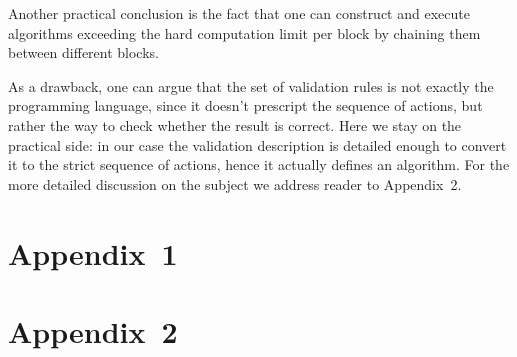 \documentclass[runningheads]{llncs}
\begin{document}
    Another practical conclusion is the fact that one can construct and execute
    algorithms exceeding the hard computation limit per block by chaining them
    between different blocks.

    As a drawback, one can argue that the set of validation rules is not exactly
    the programming language, since it doesn't prescript the sequence of actions,
    but rather the way to check whether the result is correct. Here we stay on the
    practical side: in our case the validation description is detailed enough to
    convert it to the strict sequence of actions, hence it actually defines an
    algorithm. For the more detailed discussion on the subject we address reader
    to Appendix~2.

    

    \section{Appendix~1}
    \label{appendix1}

    \section{Appendix~2}
    \label{appendix2}

\end{document}
